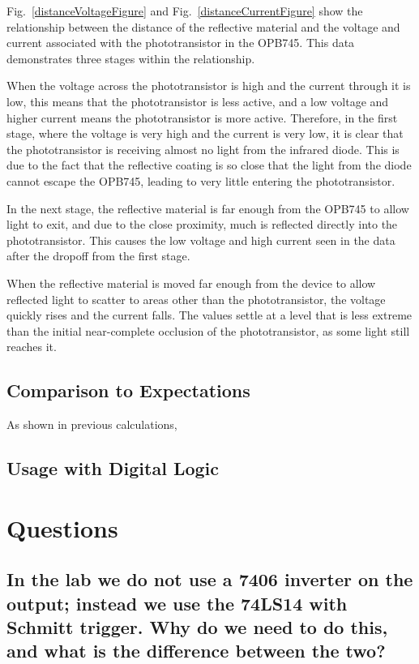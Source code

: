 \documentclass[conference]{IEEEtran}
\begin{document}
Fig.~\ref{distanceVoltageFigure} and Fig.~\ref{distanceCurrentFigure}
show the relationship between the distance of the reflective
material and the voltage and current associated with the
phototransistor in the OPB745. This data demonstrates three
stages within the relationship. 

When the voltage across the phototransistor is high and
the current through it is low, this means that the phototransistor is
less active, and a low voltage and higher current means
the phototransistor is more active. Therefore, in the first
stage, where the voltage is very high and the current is very
low, it is clear that the phototransistor is receiving almost
no light from the infrared diode. This is due to the fact
that the reflective coating is so close that the light from
the diode cannot escape the OPB745, leading to very little entering
the phototransistor.

In the next stage, the reflective material is far enough
from the OPB745 to allow light to exit, and due to the close
proximity, much is reflected directly into the phototransistor.
This causes the low voltage and high current seen in the data
after the dropoff from the first stage.

When the reflective material is moved far enough from the
device to allow reflected light to scatter to areas
other than the phototransistor, the voltage quickly rises and
the current falls. The values settle at a level that is
less extreme than the initial near-complete occlusion of
the phototransistor, as some light still reaches it.

\subsection{Comparison to Expectations}
As shown in previous calculations, 

\subsection{Usage with Digital Logic}

\section{Questions}

\subsection{In the lab we do not use a 7406 inverter on the output; instead we use the 74LS14 with Schmitt
trigger. Why do we need to do this, and what is the difference between the two?}
\end{document}
